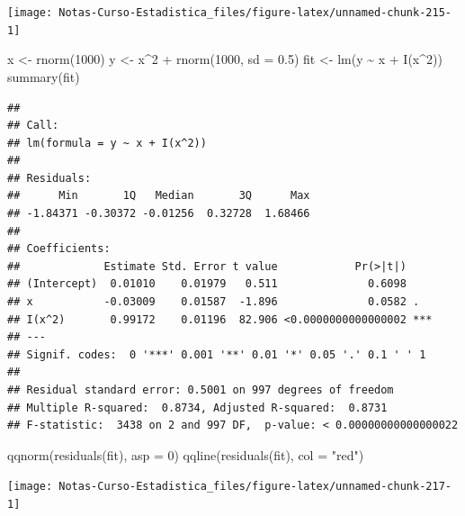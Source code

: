 \documentclass[
  12pt,
]{book}
\newenvironment{Shaded}{\begin{snugshade}}{\end{snugshade}}
\newcommand{\AttributeTok}[1]{\textcolor[rgb]{0.77,0.63,0.00}{#1}}
\newcommand{\DecValTok}[1]{\textcolor[rgb]{0.00,0.00,0.81}{#1}}
\newcommand{\FloatTok}[1]{\textcolor[rgb]{0.00,0.00,0.81}{#1}}
\newcommand{\FunctionTok}[1]{\textcolor[rgb]{0.00,0.00,0.00}{#1}}
\newcommand{\NormalTok}[1]{#1}
\newcommand{\OtherTok}[1]{\textcolor[rgb]{0.56,0.35,0.01}{#1}}
\newcommand{\SpecialCharTok}[1]{\textcolor[rgb]{0.00,0.00,0.00}{#1}}
\newcommand{\StringTok}[1]{\textcolor[rgb]{0.31,0.60,0.02}{#1}}
\theoremstyle{definition}
\theoremstyle{definition}
\theoremstyle{definition}
\theoremstyle{remark}
\begin{document}
\begin{center}\texttt{[image: Notas-Curso-Estadistica\_files/figure-latex/unnamed-chunk-215-1]} \end{center}

\begin{Shaded}
\begin{Highlighting}[]
\NormalTok{x }\OtherTok{\textless{}{-}} \FunctionTok{rnorm}\NormalTok{(}\DecValTok{1000}\NormalTok{)}
\NormalTok{y }\OtherTok{\textless{}{-}}\NormalTok{ x}\SpecialCharTok{\^{}}\DecValTok{2} \SpecialCharTok{+} \FunctionTok{rnorm}\NormalTok{(}\DecValTok{1000}\NormalTok{, }\AttributeTok{sd =} \FloatTok{0.5}\NormalTok{)}
\NormalTok{fit }\OtherTok{\textless{}{-}} \FunctionTok{lm}\NormalTok{(y }\SpecialCharTok{\textasciitilde{}}\NormalTok{ x }\SpecialCharTok{+} \FunctionTok{I}\NormalTok{(x}\SpecialCharTok{\^{}}\DecValTok{2}\NormalTok{))}
\FunctionTok{summary}\NormalTok{(fit)}
\end{Highlighting}
\end{Shaded}

\begin{verbatim}
## 
## Call:
## lm(formula = y ~ x + I(x^2))
## 
## Residuals:
##      Min       1Q   Median       3Q      Max 
## -1.84371 -0.30372 -0.01256  0.32728  1.68466 
## 
## Coefficients:
##             Estimate Std. Error t value            Pr(>|t|)    
## (Intercept)  0.01010    0.01979   0.511              0.6098    
## x           -0.03009    0.01587  -1.896              0.0582 .  
## I(x^2)       0.99172    0.01196  82.906 <0.0000000000000002 ***
## ---
## Signif. codes:  0 '***' 0.001 '**' 0.01 '*' 0.05 '.' 0.1 ' ' 1
## 
## Residual standard error: 0.5001 on 997 degrees of freedom
## Multiple R-squared:  0.8734, Adjusted R-squared:  0.8731 
## F-statistic:  3438 on 2 and 997 DF,  p-value: < 0.00000000000000022
\end{verbatim}

\begin{Shaded}
\begin{Highlighting}[]
\FunctionTok{qqnorm}\NormalTok{(}\FunctionTok{residuals}\NormalTok{(fit), }\AttributeTok{asp =} \DecValTok{0}\NormalTok{)}
\FunctionTok{qqline}\NormalTok{(}\FunctionTok{residuals}\NormalTok{(fit), }\AttributeTok{col =} \StringTok{"red"}\NormalTok{)}
\end{Highlighting}
\end{Shaded}

\begin{center}\texttt{[image: Notas-Curso-Estadistica\_files/figure-latex/unnamed-chunk-217-1]} \end{center}
\end{document}
